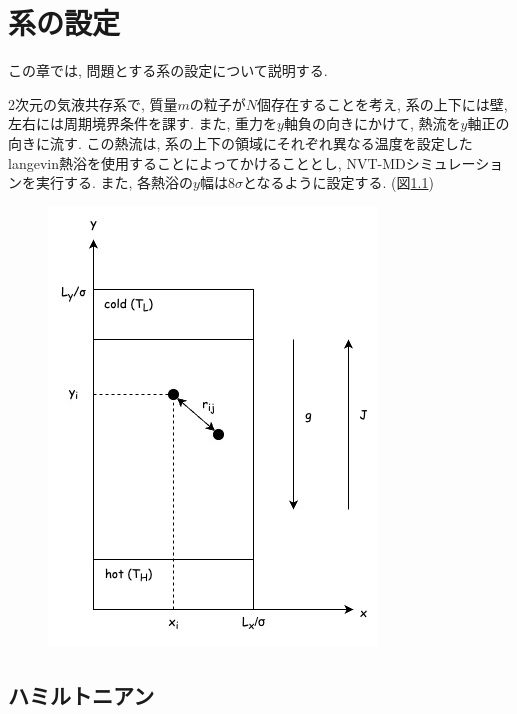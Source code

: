 \chapter{系の設定}

この章では, 問題とする系の設定について説明する. 

2次元の気液共存系で, 質量$m$の粒子が$N$個存在することを考え, 系の上下には壁, 左右には周期境界条件を課す. また, 重力を$y$軸負の向きにかけて, 熱流を$y$軸正の向きに流す. この熱流は, 系の上下の領域にそれぞれ異なる温度を設定したlangevin熱浴を使用することによってかけることとし, NVT-MDシミュレーションを実行する. また, 各熱浴の$y$幅は$8\sigma$となるように設定する. (図\ref{fig:system})


\begin{figure}[H]
  \centering
  \caption{}
  \label{fig:system}
  \includegraphics[scale=0.7]{image/system.jpg}
\end{figure}

\section{ハミルトニアン}

